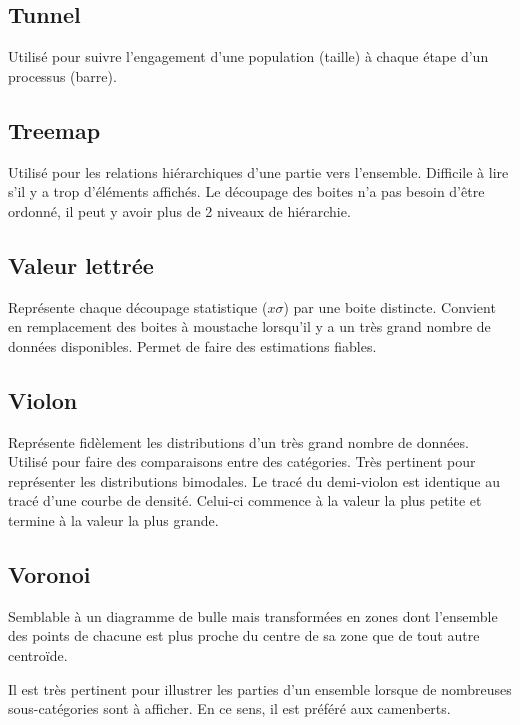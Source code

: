 \documentclass[a4paper,12pt]{article}
\begin{document}
\begin{multicols}{2}
\subsection*{Tunnel}
\label{sec:orged5b619}
Utilisé pour suivre l'engagement d'une population (taille) à chaque étape d'un processus (barre). \autocite{mikeyiHowChooseRight2020}
\subsection*{Treemap}
\label{sec:orga49b524}
Utilisé pour les relations hiérarchiques d'une partie vers l'ensemble. Difficile à lire s'il y a trop d'éléments affichés. \autocite{alansmithLexiqueVisuel}
Le découpage des boites n'a pas besoin d'être ordonné, il peut y avoir plus de 2 niveaux de hiérarchie. \autocite{mikeyiHowChooseRight2020}
\subsection*{Valeur lettrée}
\label{sec:org42d96c9}
Représente chaque découpage statistique (\(x\sigma\)) par une boite distincte. Convient en remplacement des boites à moustache lorsqu'il y a un très grand nombre de données disponibles. Permet de faire des estimations fiables. \autocite{hofmannLettervaluePlotsBoxplots2017,mikeyiHowChooseRight2020}
\subsection*{Violon}
\label{sec:orgf190433}
Représente fidèlement les distributions d'un très grand nombre de données. \autocite{alansmithLexiqueVisuel} Utilisé pour faire des comparaisons entre des catégories. \autocite{mikeyiHowChooseRight2020}  Très pertinent pour représenter les distributions bimodales. \autocite{wilkeVisualizingManyDistributions2019} Le tracé du demi-violon est identique au tracé d'une courbe de densité. Celui-ci commence à la valeur la plus petite et termine à la valeur la plus grande.
\subsection*{Voronoi}
\label{sec:orgcb26d86}
Semblable à un diagramme de bulle mais transformées en zones dont l'ensemble des points de chacune est plus proche du centre de sa zone que de tout autre centroïde. \autocite{alansmithLexiqueVisuel}

Il est très pertinent pour illustrer les parties d'un ensemble lorsque de nombreuses sous-catégories sont à afficher. \autocite{jonathanschwabishParttowhole2021} En ce sens, il est préféré aux camenberts.

\end{multicols}
\end{document}

